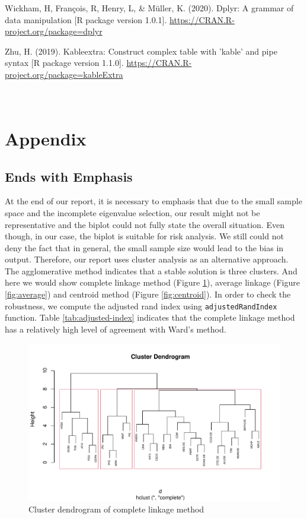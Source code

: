 \documentclass[11pt,a4paper,]{article}
\begin{document}
Wickham, H, François, R, Henry, L, \& Müller, K. (2020). Dplyr: A grammar of data manipulation {[}R
package version 1.0.1{]}. \url{https://CRAN.R-project.org/package=dplyr}

Zhu, H. (2019). Kableextra: Construct complex table with 'kable' and pipe syntax {[}R package version
1.1.0{]}. \url{https://CRAN.R-project.org/package=kableExtra}

\clearpage

\appendix
\section{\\Appendix}

\hypertarget{ends-with-emphasis}{%
\subsection{Ends with Emphasis}\label{ends-with-emphasis}}

At the end of our report, it is necessary to emphasis that due to the small sample space and the incomplete eigenvalue selection, our result might not be representative and the biplot could not fully state the overall situation. Even though, in our case, the biplot is suitable for risk analysis. We still could not deny the fact that in general, the small sample size would lead to the bias in output. Therefore, our report uses cluster analysis as an alternative approach. The agglomerative method indicates that a stable solution is three clusters. And here we would show complete linkage method (Figure \ref{fig:complete}), average linkage (Figure \ref{fig:average}) and centroid method (Figure \ref{fig:centroid}). In order to check the robustness, we compute the adjusted rand index using \texttt{adjustedRandIndex} function. Table \ref{tab:adjusted-index} indicates that the complete linkage method has a relatively high level of agreement with Ward's method.

\begin{figure}
\centering
\includegraphics{ass2_files/figure-latex/complete-1.pdf}
\caption{\label{fig:complete}Cluster dendrogram of complete linkage method}
\end{figure}
\end{document}
